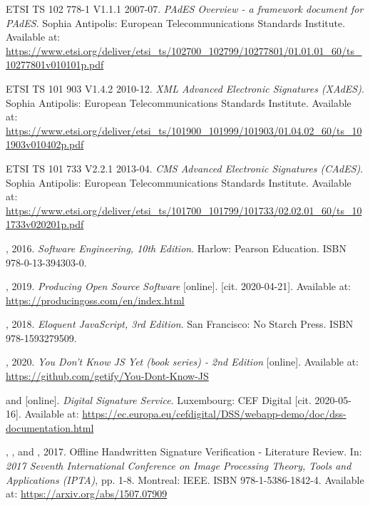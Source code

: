 \documentclass[thesismargins, english, thesislinespacing, onelinechapterstyle, upjsfrontpage]{rnthesis}
\begin{document}
\begin{thebibliography}{9}
  ETSI TS 102 778-1 V1.1.1 2007-07. \emph{PAdES Overview - a framework document for PAdES}. Sophia Antipolis: European Telecommunications Standards Institute. Available at: \url{https://www.etsi.org/deliver/etsi_ts/102700_102799/10277801/01.01.01_60/ts_10277801v010101p.pdf}

  ETSI TS 101 903 V1.4.2 2010-12. \emph{XML Advanced Electronic Signatures (XAdES)}. Sophia Antipolis: European Telecommunications Standards Institute. Available at: \url{https://www.etsi.org/deliver/etsi_ts/101900_101999/101903/01.04.02_60/ts_101903v010402p.pdf}

  ETSI TS 101 733 V2.2.1 2013-04. \emph{CMS Advanced Electronic Signatures (CAdES)}. Sophia Antipolis: European Telecommunications Standards Institute. Available at: \url{https://www.etsi.org/deliver/etsi_ts/101700_101799/101733/02.02.01_60/ts_101733v020201p.pdf}

  , 2016. \emph{Software Engineering, 10th Edition}. Harlow: Pearson Education. ISBN 978-0-13-394303-0.

  , 2019. \emph{Producing Open Source Software} [online]. [cit. 2020-04-21]. Available at: \url{https://producingoss.com/en/index.html}

  , 2018. \emph{Eloquent JavaScript, 3rd Edition}. San Francisco: No Starch Press. ISBN 978-1593279509.

  , 2020. \emph{You Don't Know JS Yet (book series) - 2nd Edition} [online]. Available at: \url{https://github.com/getify/You-Dont-Know-JS}

   and  [online]. \emph{Digital Signature Service}. Luxembourg: CEF Digital [cit. 2020-05-16]. Available at: \url{https://ec.europa.eu/cefdigital/DSS/webapp-demo/doc/dss-documentation.html}

  , , and , 2017. Offline Handwritten Signature Verification - Literature Review. In: \emph{2017 Seventh International Conference on Image Processing Theory, Tools and Applications (IPTA)}, pp. 1-8. Montreal: IEEE. ISBN 978-1-5386-1842-4. Available at: \url{https://arxiv.org/abs/1507.07909}

\end{thebibliography}
\end{document}
